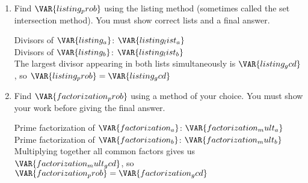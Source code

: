 
\begin{enumerate}

    \item Find $\VAR{listing_prob}$ using the listing method (sometimes called the set intersection method). You must show correct lists and a final answer.

    \vfill

    \begin{ansenv}
        Divisors of $\VAR{listing_a}$: $\VAR{listing_list_a}$\\

        Divisors of $\VAR{listing_b}$: $\VAR{listing_list_b}$\\

        The largest divisor appearing in both lists simultaneously is $\VAR{listing_gcd}$, so $\VAR{listing_prob} = \VAR{listing_gcd}$
    \end{ansenv}

    \vfill

    \item Find $\VAR{factorization_prob}$ using a method of your choice. You must show your work before giving the final answer.

    \vfill

    \begin{ansenv}
        Prime factorization of $\VAR{factorization_a}$: $\VAR{factorization_mult_a}$\\

        Prime factorization of $\VAR{factorization_b}$: $\VAR{factorization_mult_b}$\\

        Multiplying together all common factors gives us $\VAR{factorization_mult_gcd}$, so $\VAR{factorization_prob} = \VAR{factorization_gcd}$
    \end{ansenv}

    \vfill

\end{enumerate}

\trueemptypage